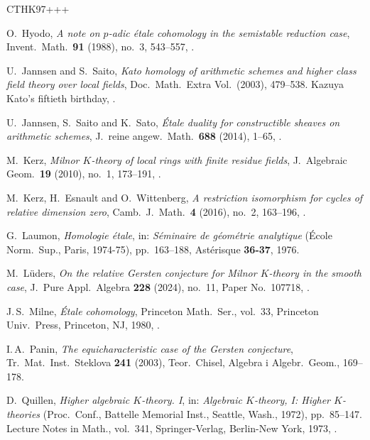 \begin{thebibliography}{CTHK97+++}
  
O.~Hyodo, \emph{A note on {$p$}-adic \'{e}tale cohomology in the semistable
  reduction case}, Invent.\ Math.\ \textbf{91} (1988), no.~3, 543--557,
  .

U.~Jannsen and S.~Saito, \emph{Kato homology of arithmetic schemes and higher
  class field theory over local fields}, Doc.\ Math.\ Extra Vol.\ (2003), 
  479--538. Kazuya Kato's fiftieth birthday, .

U.~Jannsen, S.~Saito and K.~Sato, \emph{\'{E}tale duality for constructible
  sheaves on arithmetic schemes}, J.~reine angew.\ Math.\ \textbf{688} (2014),
  1--65, .

M.~Kerz, \emph{Milnor {$K$}-theory of local rings with finite residue fields},
  J.~Algebraic Geom.\ \textbf{19} (2010), no.~1, 173--191,
  .

M.~Kerz, H.~Esnault and O.~Wittenberg, \emph{A restriction isomorphism for
  cycles of relative dimension zero}, Camb.~J.\ Math.\ \textbf{4} (2016), no.~2,
  163--196, .

G.~Laumon, \emph{Homologie \'{e}tale}, in: \emph{S\'{e}minaire de g\'{e}om\'{e}trie analytique} (\'{E}cole {N}orm.\ {S}up., {P}aris, 1974-75),  pp.~163--188,  Ast\'{e}risque \textbf{36-37}, 1976.

M.~L{\"u}ders, \emph{On the relative {Gersten} conjecture for {Milnor}
  {{\(K\)}}-theory in the smooth case}, J.~Pure Appl.\ Algebra \textbf{228}
  (2024), no.~11, Paper No.~107718, .

J.\,S.~Milne, \emph{\'Etale cohomology}, Princeton Math.\ Ser., vol.~33,
  Princeton Univ.\ Press, Princeton, NJ, 1980, .

I.\,A.~Panin, \emph{The equicharacteristic case of the {G}ersten conjecture}, Tr.\ Mat.\ Inst.\ Steklova \textbf{241} (2003), Teor.\ Chisel, Algebra i Algebr.\  Geom., 169--178.

D.~Quillen, \emph{Higher algebraic {$K$}-theory. {I}}, in: \emph{Algebraic {$K$}-theory, {I}: {H}igher {$K$}-theories} ({P}roc.\ {C}onf., {B}attelle {M}emorial {I}nst., {S}eattle, {W}ash., 1972), pp.~85--147. Lecture Notes in Math., vol.~341, Springer-Verlag, Berlin-New York, 1973, .


\end{thebibliography}
